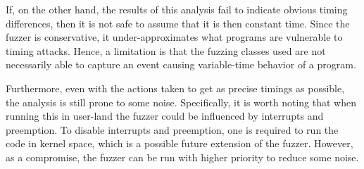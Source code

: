 If, on the other hand, the results of this analysis fail to indicate obvious timing differences, then it is not safe to assume that it is then constant time. 
Since the fuzzer is conservative, it under-approximates what programs are vulnerable to timing attacks.
Hence, a limitation is that the fuzzing classes used are not necessarily able to capture an event causing variable-time behavior of a program. 

Furthermore, even with the actions taken to get as precise timings as possible, the analysis is still prone to some noise. 
Specifically, it is worth noting that when running this in user-land the fuzzer could be influenced by interrupts and preemption. 
To disable interrupts and preemption, one is required to run the code in kernel space, which is a possible future extension of the fuzzer. 
However, as a compromise, the fuzzer can be run with higher priority to reduce some noise. 
